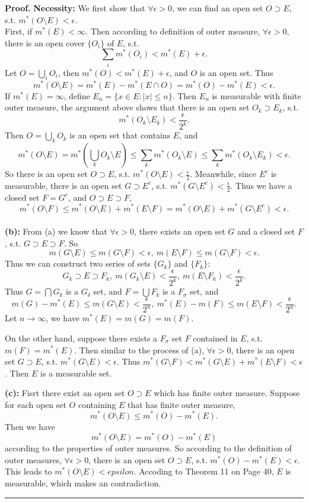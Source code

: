 \documentclass{article}%
\newenvironment{proof}[1][Proof]{\textbf{#1.} }{\ \rule{0.5em}{0.5em}}
\begin{document}
\begin{enumerate}
\begin{proof}
\textbf{Necessity:} We first show that $\forall \epsilon > 0$, we can find an open set $O\supset E$, s.t. $m^*(O\setminus E) < \epsilon$. \\[2pt]
First, if $m^*(E) <\infty$. Then according to definition of outer measure, $\forall\epsilon > 0$, there is an open cover $\{O_i\}$ of $E$, s.t. 
$$
\sum_{i}m^*(O_i) < m^*(E)+\epsilon.
$$
Let $O = \bigcup_{i}O_i$, then $m^*(O) < m^*(E)+\epsilon$, and $O$ is an open set. Thus 
$$
m^*(O\setminus E) = m^*(E)-m^*(E\cap O) = m^*(O)-m^*(E) < \epsilon.
$$
If $m^*(E) = \infty$, define $E_{n} = \{x\in E:|x|\le n\}$. Then $E_n$ is measurable with finite outer measure, the argument above shows that there is an open set $O_k\supset E_k$, s.t.
$$
m^*(O_k\setminus E_k) < \frac{\epsilon}{2^k}.
$$
Then $O = \bigcup_{k} O_k$ is an open set that contains $E$, and 
$$
m^*(O\setminus E) = m^*\left(\bigcup_{k}O_k\setminus E\right)\le\sum_{k}m^*(O_k\setminus E)\le\sum_{k}m^*(O_k\setminus E_k)<\epsilon.
$$
So there is an open set $O\supset E$, s.t. $m^*(O\setminus E) < \frac{\epsilon}{2}$. Meanwhile, since $E^c$ is measurable, there is an open set $G\supset E^c$, s.t. $m^*(G\setminus E^c)<\frac{\epsilon}{2}$. Thus we have a closed set $F = G^c$, and $O\supset E\supset F$,
$$
m^*(O\setminus F) \le m^*(O\setminus E)+m^*(E\setminus F) = m^*(O\setminus E)+m^*(G\setminus E^c) < \epsilon.
$$
\\[2pt]
\textbf{(b):}
From (a) we know that $\forall \epsilon > 0$, there exists an open set $G$ and a closed set $F$, s.t. $G\supset E\supset F$. So 
$$
m(G\setminus E) \le m(G\setminus F) < \epsilon, ~m(E\setminus F) \le m(G\setminus F) < \epsilon.
$$
Thus we can construct two series of sets $\{G_k\}$ and $\{F_k\}$:
$$
G_k\supset E\supset F_k, ~m(G_k\setminus E) < \frac{\epsilon}{2^k}, ~m(E\setminus F_k) < \frac{\epsilon}{2^k}.
$$
Thus $G = \bigcap G_k$ is a $G_\delta$ set, and $F = \bigcup F_k$ is a $F_\sigma$ set, and
$$
m(G) - m^*(E) \le m(G\setminus E) < \frac{\epsilon}{2^n}, ~m^*(E)-m(F)\le m(E\setminus F) < \frac{\epsilon}{2^n}.
$$
Let $n\to\infty$, we have $m^*(E) = m(G) = m(F)$.

On the other hand, suppose there exists a $F_\sigma$ set $F$ contained in $E$, s.t. $m(F) = m^*(E)$. Then similar to the process of (a), $\forall \epsilon > 0$, there is an open set $G\supset E$, s.t. $m^*(G\setminus E) < \epsilon$. Thus $m^*(G\setminus F) < m^*(G\setminus E) + m^*(E\setminus F) < \epsilon$. Then $E$ is a measurable set. 

\textbf{(c):}
Fisrt there exist an open set $O\supset E$ which has finite outer measure.
Suppose for each open set $O$ containing $E$ that has finite outer measure, 
$$
m^*(O\setminus E) \le m^*(O)-m^*(E).
$$
Then we have
$$
m^*(O\setminus E) = m^*(O)-m^*(E)
$$
according to the properties of outer measures. 
So according to the definition of outer measures, $\forall \epsilon > 0$, there is an open set $O\supset E$, s.t. $m^*(O)-m^*(E) < \epsilon$. This leads to $m^*(O\setminus E) < epsilon$. Accoding to Theorem 11 on Page 40, $E$ is measurable, which makes an contradiction. 
\end{proof}
\bigskip



\end{enumerate}
\end{document}
